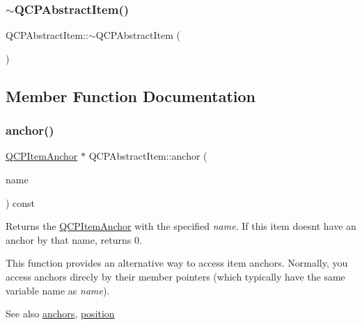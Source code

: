 \subsubsection{\texorpdfstring{$\sim$QCPAbstractItem()}{~QCPAbstractItem()}}
{\footnotesize\ttfamily Q\+C\+P\+Abstract\+Item\+::$\sim$\+Q\+C\+P\+Abstract\+Item (\begin{DoxyParamCaption}{ }\end{DoxyParamCaption})\hspace{0.3cm}{\ttfamily [virtual]}}



\subsection{Member Function Documentation}
\mbox{\label{class_q_c_p_abstract_item_a139c255ea8831642fac91748e29a5adb}} 
\subsubsection{\texorpdfstring{anchor()}{anchor()}}
{\footnotesize\ttfamily \mbox{\hyperlink{class_q_c_p_item_anchor}{Q\+C\+P\+Item\+Anchor}} $\ast$ Q\+C\+P\+Abstract\+Item\+::anchor (\begin{DoxyParamCaption}\item[{const Q\+String \&}]{name }\end{DoxyParamCaption}) const}

Returns the \mbox{\hyperlink{class_q_c_p_item_anchor}{Q\+C\+P\+Item\+Anchor}} with the specified {\itshape name}. If this item doesn\textquotesingle{}t have an anchor by that name, returns 0.

This function provides an alternative way to access item anchors. Normally, you access anchors direcly by their member pointers (which typically have the same variable name as {\itshape name}).

\begin{DoxySeeAlso}{See also}
\mbox{\hyperlink{class_q_c_p_abstract_item_a81d1ecfea3368b836cf9675a0045e659}{anchors}}, \mbox{\hyperlink{class_q_c_p_abstract_item_a2589c3d298f9a576d77d9addb440a18d}{position}} 
\end{DoxySeeAlso}
\mbox{\label{class_q_c_p_abstract_item_ada5bad4e1196c4fc0d0d12328e24b8f2}} 
